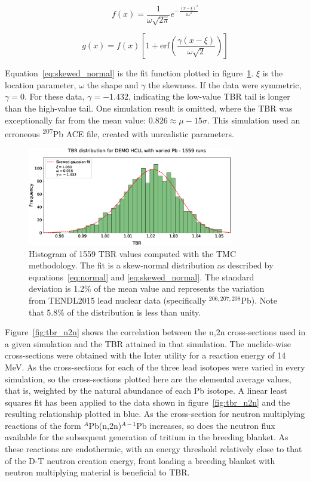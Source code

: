 \begin{equation}
  \label{eq:normal}
  f(x) = \frac{1}{\omega \sqrt{2 \pi}} e^{-\frac{(x-\xi)^{2}}{2 \omega^{2}}}
\end{equation}

\begin{equation}
  \label{eq:skewed_normal}
  g(x) = f(x) \left[1 + \mathrm{erf} \left( \frac{\gamma(x - \xi)}{\omega \sqrt{2}} \right) \right]
\end{equation}

Equation~\ref{eq:skewed_normal} is the fit function plotted in figure~\ref{fig:tbr_distribution}. $\xi$ is the location parameter, $\omega$ the shape and $\gamma$ the skewness. If the data were symmetric, $\gamma = 0$. For these data, $\gamma = -1.432$, indicating the low-value TBR tail is longer than the high-value tail. One simulation result is omitted, where the TBR was exceptionally far from the mean value: $0.826 \approx \mu - 15\sigma$. This simulation used an erroneous \textsuperscript{207}Pb ACE file, created with unrealistic parameters.

\begin{figure}[H]
  \centering
	\includegraphics[width=0.8\textwidth]{hcll_hist_1559}
	\caption{Histogram of 1559 TBR values computed with the TMC methodology. The fit is a skew-normal distribution as described by equations~\ref{eq:normal} and \ref{eq:skewed_normal}. The standard deviation is 1.2\% of the mean value and represents the variation from TENDL2015 lead nuclear data (specifically $^{206,207,208}$Pb). Note that 5.8\% of the distribution is less than unity.}
	\label{fig:tbr_distribution}
\end{figure}

Figure~\ref{fig:tbr_n2n} shows the correlation between the n,2n cross-sections used in a given simulation and the TBR attained in that simulation. The nuclide-wise cross-sections were obtained with the Inter utility for a reaction energy of 14 MeV. As the cross-sections for each of the three lead isotopes were varied in every simulation, so the cross-sections plotted here are the elemental average values, that is, weighted by the natural abundance of each Pb isotope. A linear least squares fit has been applied to the data shown in figure~\ref{fig:tbr_n2n} and the resulting relationship plotted in blue. As the cross-section for neutron multiplying reactions of the form $^{A}$Pb(n,2n)$^{A-1}$Pb increases, so does the neutron flux available for the subsequent generation of tritium in the breeding blanket. As these reactions are endothermic, with an energy threshold relatively close to that of the D-T neutron creation energy, front loading a breeding blanket with neutron multiplying material is beneficial to TBR.

